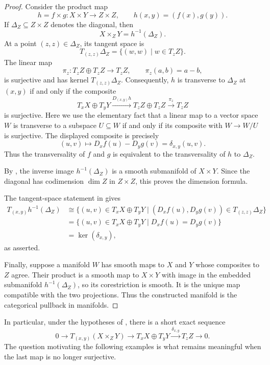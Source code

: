 \begin{proof}
  Consider the product map
  \[
    h=f\times g\colon X\times Y\longrightarrow Z\times Z,
    \qquad
    h(x,y)=(f(x),g(y)).
  \]
  If $\Delta_Z\subseteq Z\times Z$ denotes the diagonal, then
  \[
    X\times_ZY=h^{-1}(\Delta_Z).
  \]
  At a point $(z,z)\in\Delta_Z$, its tangent space is
  \[
    T_{(z,z)}\Delta_Z=\{(w,w)\mid w\in T_zZ\}.
  \]
  The linear map
  \[
    \pi_z\colon T_zZ\oplus T_zZ\longrightarrow T_zZ,
    \qquad
    \pi_z(a,b)=a-b,
  \]
  is surjective and has kernel $T_{(z,z)}\Delta_Z$. Consequently, $h$ is
  transverse to $\Delta_Z$ at $(x,y)$ if and only if the composite
  \[
    T_xX\oplus T_yY
    \xrightarrow{D_{(x,y)}h}
    T_zZ\oplus T_zZ
    \xrightarrow{\pi_z}
    T_zZ
  \]
  is surjective. Here we use the elementary fact that a linear map to a vector
  space $W$ is transverse to a subspace $U\subseteq W$ if and only if its
  composite with $W\to W/U$ is surjective. The displayed composite is
  precisely
  \[
    (u,v)\longmapsto D_xf(u)-D_yg(v)=\delta_{x,y}(u,v).
  \]
  Thus the transversality of $f$ and $g$ is equivalent to the transversality
  of $h$ to $\Delta_Z$.

  By , the inverse image
  $h^{-1}(\Delta_Z)$ is a smooth submanifold of $X\times Y$. Since the diagonal
  has codimension $\dim Z$ in $Z\times Z$, this proves the dimension formula.

  The tangent-space statement in  gives
  \begin{align*}
    T_{(x,y)}h^{-1}(\Delta_Z)
    &\cong
      \{(u,v)\in T_xX\oplus T_yY
        \mid (D_xf(u),D_yg(v))\in T_{(z,z)}\Delta_Z\} \\
    &=\{(u,v)\in T_xX\oplus T_yY
        \mid D_xf(u)=D_yg(v)\} \\
    &=\ker(\delta_{x,y}),
  \end{align*}
  as asserted.

  Finally, suppose a manifold $W$ has smooth maps to $X$ and $Y$ whose
  composites to $Z$ agree. Their product is a smooth map to $X\times Y$
  with image in the embedded submanifold $h^{-1}(\Delta_Z)$, so its
  corestriction is smooth. It is the unique map compatible with the two
  projections. Thus the constructed manifold is the categorical pullback
  in manifolds.
\end{proof}

In particular, under the hypotheses of
, there is a short exact sequence
\[
  0\longrightarrow T_{(x,y)}(X\times_ZY)
  \longrightarrow T_xX\oplus T_yY
  \xrightarrow{\delta_{x,y}}T_zZ
  \longrightarrow0.
\]
The question motivating the following examples is what remains meaningful when
the last map is no longer surjective.

